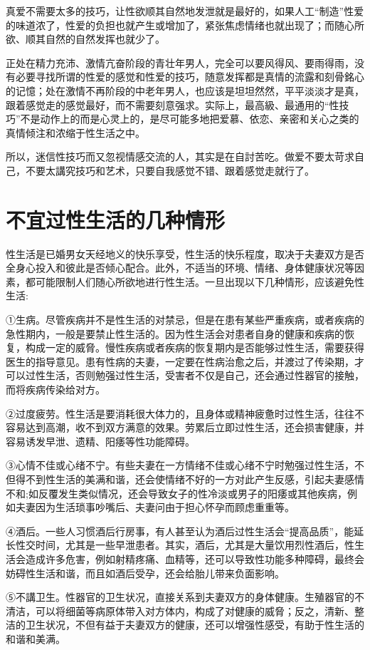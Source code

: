 \documentclass[12pt,UTF8]{ctexbook}
\begin{document}
真爱不需要太多的技巧，让性欲顺其自然地发泄就是最好的，如果人工“制造”性爱的味道浓了，性爱的负担也就产生或增加了，紧张焦虑情绪也就出现了；而随心所欲、顺其自然的自然发挥也就少了。

正处在精力充沛、激情亢奋阶段的青壮年男人，完全可以要风得风、要雨得雨，没有必要寻找所谓的性爱的感觉和性爱的技巧，随意发挥都是真情的流露和刻骨銘心的记憶；处在激情不再阶段的中老年男人，也应该是坦坦然然，平平淡淡才是真，跟着感觉走的感觉最好，而不需要刻意强求。实际上，最高級、最通用的“性技巧”不是动作上的而是心灵上的，是尽可能多地把爱慕、依恋、亲密和关心之类的真情倾注和浓缩于性生活之中。

所以，迷信性技巧而又忽视情感交流的人，其实是在自討苦吃。做爱不要太苛求自己，不要太講究技巧和艺术，只要自我感觉不错、跟着感觉走就行了。

\section{不宜过性生活的几种情形}


性生活是已婚男女天经地义的快乐享受，性生活的快乐程度，取决于夫妻双方是否全身心投入和彼此是否倾心配合。此外，不适当的环境、情绪、身体健康状况等因素，都可能限制人们随心所欲地进行性生活。一旦出现以下几种情形，应该避免性生活:

①生病。尽管疾病并不是性生活的对禁忌，但是在患有某些严重疾病，或者疾病的急性期内，一般是要禁止性生活的。因为性生活会对患者自身的健康和疾病的恢复，构成一定的威脅。慢性疾病或者疾病的恢复期内是否能够过性生活，需要获得医生的指导意见。患有性病的夫妻，一定要在性病治愈之后，并渡过了传染期，才可以过性生活，否则勉强过性生活，受害者不仅是自己，还会通过性器官的接触，而将疾病传染给对方。

②过度疲劳。性生活是要消耗很大体力的，且身体或精神疲惫时过性生活，往往不容易达到高潮，收不到双方满意的效果。劳累后立即过性生活，还会损害健康，并容易诱发早泄、遗精、阳痿等性功能障碍。

③心情不佳或心绪不宁。有些夫妻在一方情绪不佳或心绪不宁时勉强过性生活，不但得不到性生活的美满和谐，还会使情绪不好的一方对此产生反感，引起夫妻感情不和;如反覆发生类似情况，还会导致女子的性冷淡或男子的阳痿或其他疾病，例如夫妻因为生活琐事吵嘴后、夫妻问由于担心怀孕而顾虑重重等。

④酒后。一些人习惯酒后行房事，有人甚至认为酒后过性生活会“提高品质”，能延长性交时间，尤其是一些早泄患者。其实，酒后，尤其是大量饮用烈性酒后，性生活会造成许多危害，例如射精疼痛、血精等，还可以导致性功能多种障碍，最终会妨碍性生活和谐，而且如酒后受孕，还会给胎儿带来负面影响。

⑤不講卫生。性器官的卫生状况，直接关系到夫妻双方的身体健康。生殖器官的不清洁，可以将细菌等病原体带入对方体内，构成了对健康的威脅；反之，清新、整洁的卫生状况，不但有益于夫妻双方的健康，还可以增强性感受，有助于性生活的和谐和美满。
\end{document}
